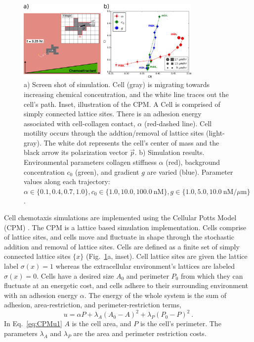\begin{figure}
    \centering
    \includegraphics[width=0.80\textwidth]{../fig/ch2_fig3.png}
    \caption{a) Screen shot of simulation. Cell (gray) is migrating towards increasing chemical concentration, and the white line traces out the cell's path. Inset, illustration of the CPM. A Cell is comprised of simply connected lattice sites. There is an adhesion energy associated with cell-collagen contact, $\alpha$ (red-dashed line). Cell motility occurs through the addtion/removal of lattice sites (light-gray). The white dot represents the cell's center of mass and the black arrow its polarization vector $\vec{p}$. b) Simulation results. Environmental parameters collagen stiffness $\alpha$ (red), background concentration $c_0$ (green), and gradient $g$ are varied (blue).
    Parameter values along each trajectory: $\alpha \in \{ 0.1, 0.4, 0.7, 1.0 \}, c_0 \in \{ 1.0, 10.0, 100.0 \ \text{nM} \}, g \in \{ 1.0, 5.0, 10.0 \ \text{nM}/\mu\text{m} \}$.}
    \label{fig:ch2_3}
\end{figure}

Cell chemotaxis simulations are implemented using the Cellular Potts Model (CPM) \cite{graner1992simulation,swat2012multi}. The CPM is a lattice based simulation implementation. Cells comprise of lattice sites, and cells move and fluctuate in shape through the stochastic addition and removal of lattice sites. Cells are defined as a finite set of simply connected lattice sites
$\{ x \}$ (Fig.\ \ref{fig:ch2_3}a, inset).
Cell lattice sites are given the lattice label $\sigma(x)=1$ whereas the extracellular environment's lattices are labeled $\sigma(x)=0$. Cells have a desired size $A_0$ and perimeter $P_0$ from which they can fluctuate at an energetic cost, and cells adhere to their surrounding environment with an adhesion energy $\alpha$. The energy of the whole system is the sum of adhesion, area-restriction, and perimeter-restriction terms,
\begin{equation} \label{eq:CPMu1}
    u = \alpha P + \lambda_A(A_0 - A)^2 + \lambda_P(P_0 - P)^2 \ .
\end{equation}
In Eq.\ \ref{eq:CPMu1} $A$ is the cell area, and $P$ is the cell's perimeter. The parameters $\lambda_{A}$ and $\lambda_{P}$ are the area and perimeter restriction costs.

